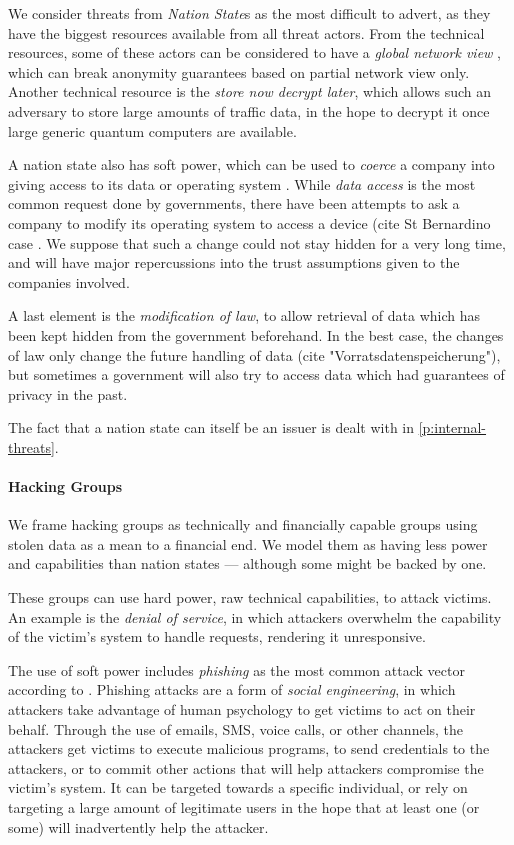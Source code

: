 We consider threats from \emph{Nation State}s as the most difficult to advert, as they have
the biggest resources available from all threat actors.
From the technical resources, some of these actors can be considered to have a \emph{global network view}
\cite{TorAttack}, which can break anonymity guarantees based on partial network view only.
Another technical resource is the \emph{store now decrypt later}, which allows such an adversary
to store large amounts of traffic data, in the hope to decrypt it once large generic quantum computers
are available.

A nation state also has soft power, which can be used to \emph{coerce} a company into giving
access to its data or operating system \cite{TelegramArrest}\cite{ProtonLogging}.
While \emph{data access} is the most common request done by governments, there have been attempts
to ask a company to modify its operating system to access a device (cite St Bernardino case
\cite{AppleSanBernardino}.
We suppose that such a change could not stay hidden for a very long time, and will have major
repercussions into the trust assumptions given to the companies involved.

A last element is the \emph{modification of law}, to allow retrieval of data which has been
kept hidden from the government beforehand.
In the best case, the changes of law only change the future handling of data (cite
"Vorratsdatenspeicherung"), but sometimes a government will also try to access
data which had guarantees of privacy in the past.

The fact that a nation state can itself be an issuer is dealt with in \ref{p:internal-threats}.

\paragraph{Hacking Groups}

We frame hacking groups as technically and financially capable groups using stolen data as a mean to a financial end.
We model them as having less power and capabilities than nation states --- although some might be backed by one.

These groups can use hard power, raw technical capabilities, to attack victims. 
An example is the \emph{denial of service}, in which attackers
overwhelm the capability of the victim's system to handle requests, rendering it unresponsive.

The use of soft power includes \emph{phishing} as the most common attack vector according to \cite{IC3-24}.
Phishing attacks are a form of \emph{social engineering}, in which attackers take advantage of human psychology to get victims to act on their behalf.
Through the use of emails, SMS, voice calls, or other channels, the attackers get victims to execute malicious programs, to send credentials to the attackers, or to commit other actions that will help attackers compromise the victim's system.
It can be targeted towards a specific individual, or rely on targeting a large amount of legitimate users in the hope that at least one (or some) will inadvertently help the attacker.

